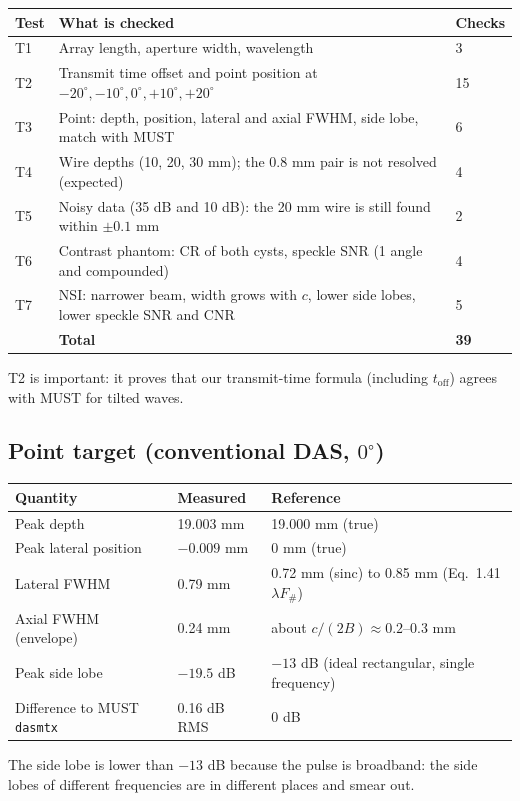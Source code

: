 \documentclass[11pt,a4paper]{article}
\begin{document}
\begin{center}
\small
\begin{tabular}{@{}p{1.0cm}p{9.6cm}p{3.0cm}@{}}
\toprule
\textbf{Test} & \textbf{What is checked} & \textbf{Checks}\\
\midrule
T1 & Array length, aperture width, wavelength & 3\\
T2 & Transmit time offset and point position at $-20^\circ, -10^\circ, 0^\circ, +10^\circ, +20^\circ$ & 15\\
T3 & Point: depth, position, lateral and axial FWHM, side lobe, match with MUST & 6\\
T4 & Wire depths (10, 20, 30 mm); the 0.8 mm pair is not resolved (expected) & 4\\
T5 & Noisy data (35 dB and 10 dB): the 20 mm wire is still found within $\pm0.1$ mm & 2\\
T6 & Contrast phantom: CR of both cysts, speckle SNR (1 angle and compounded) & 4\\
T7 & NSI: narrower beam, width grows with $c$, lower side lobes, lower speckle SNR and CNR & 5\\
\midrule
 & \textbf{Total} & \textbf{39}\\
\bottomrule
\end{tabular}
\end{center}
T2 is important: it proves that our transmit-time formula (including $t_{\text{off}}$) agrees with MUST for tilted waves.

\subsection{Point target (conventional DAS, $0^\circ$)}
\begin{center}
\begin{tabular}{@{}p{7.2cm}p{3.5cm}p{3.5cm}@{}}
\toprule
\textbf{Quantity} & \textbf{Measured} & \textbf{Reference}\\
\midrule
Peak depth & 19.003 mm & 19.000 mm (true)\\
Peak lateral position & $-0.009$ mm & 0 mm (true)\\
Lateral FWHM & 0.79 mm & 0.72 mm (sinc) to 0.85 mm (Eq.\ 1.41$\lambda F_\#$)\\
Axial FWHM (envelope) & 0.24 mm & about $c/(2B)\approx0.2$--0.3 mm\\
Peak side lobe & $-19.5$ dB & $-13$ dB (ideal rectangular, single frequency)\\
Difference to MUST \texttt{dasmtx} & 0.16 dB RMS & 0 dB\\
\bottomrule
\end{tabular}
\end{center}
The side lobe is lower than $-13$ dB because the pulse is broadband: the side lobes of different frequencies are in different places and smear out.
\end{document}
